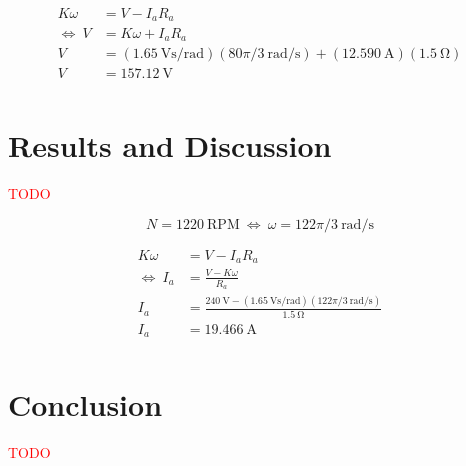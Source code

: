 \documentclass[a4paper,10pt]{article}
\newcommand{\V}{\si{\volt}\xspace}
\newcommand{\A}{\si{\ampere}\xspace}
\newcommand{\Ohm}{\si{\ohm}\xspace}
\newcommand{\rps}{\si{\radian\per\second}\xspace}
\newcommand{\RPM}{\text{RPM}\xspace}
\newcommand{\Vspr}{\si{\volt\second\per\radian}\xspace}
\begin{document}
\begin{align*}
    K \omega &= V - I_a R_a \\
    \Leftrightarrow~V &= K \omega + I_a R_a \\
    V &= (1.65~\Vspr)(80\pi/3~\rps) + (12.590~\A)(1.5~\Ohm) \\
    V &= 157.12~\V \\
\end{align*}

\section{Results and Discussion}

\textcolor{red}{TODO}

\begin{equation*}
    N = 1220~\RPM~\Leftrightarrow~\omega = 122\pi/3~\rps
\end{equation*}

\begin{align*}
    K \omega &= V - I_a R_a \\
    \Leftrightarrow~ I_a &= \frac{V - K \omega}{R_a} \\
    I_a &= \frac{240~\V - (1.65~\Vspr)(122\pi/3~\rps)}{1.5~\Ohm} \\
    I_a &= 19.466~\A \\
\end{align*}

\section{Conclusion}

\textcolor{red}{TODO}

\printbibliography[category=cited]
\printbibliography[
    notcategory=cited,omitnumbers=true,title={Bibliography}
]

\clearpage

\end{document}
